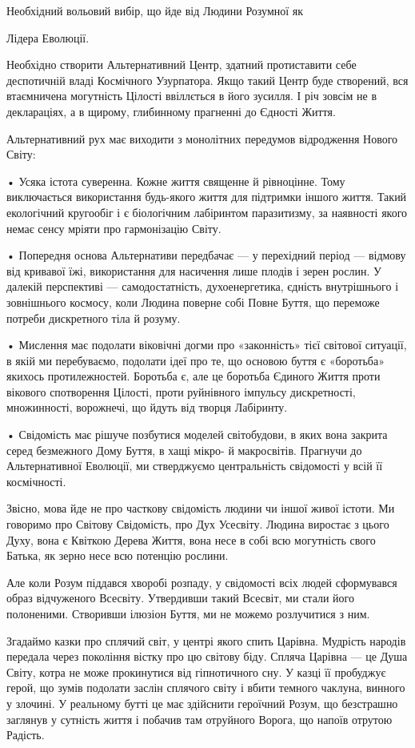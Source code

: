 Необхідний вольовий вибір, що йде від Людини Розумної як

Лідера Еволюції.

Необхідно створити Альтернативний Центр, здатний протиставити себе деспотичній
владі Космічного Узурпатора. Якщо такий Центр буде створений, вся втаємничена
могутність Цілості ввіллється в його зусилля. І річ зовсім не в деклараціях, а
в щирому, глибинному прагненні до Єдності Життя.

Альтернативний рух має виходити з монолітних передумов відродження Нового
Світу:

• Усяка істота суверенна. Кожне життя священне й рівноцінне. Тому виключається
використання будь-якого життя для підтримки іншого життя. Такий екологічний
кругообіг і є біологічним лабіринтом паразитизму, за наявності якого немає
сенсу мріяти про гармонізацію Світу.

• Попередня основа Альтернативи передбачає — у перехідний період — відмову від
кривавої їжі, використання для насичення лише плодів і зерен рослин. У далекій
перспективі — самодостатність, духоенергетика, єдність внутрішнього і
зовнішнього космосу, коли Людина поверне собі Повне Буття, що переможе потреби
дискретного тіла й розуму.

• Мислення має подолати віковічні догми про «законність» тієї світової
ситуації, в якій ми перебуваємо, подолати ідеї про те, що основою буття є
«боротьба» якихось протилежностей. Боротьба є, але це боротьба Єдиного Життя
проти вікового спотворення Цілості, проти руйнівного імпульсу дискретності,
множинності, ворожнечі, що йдуть від творця Лабіринту.

• Свідомість має рішуче позбутися моделей світобудови, в яких вона закрита
серед безмежного Дому Буття, в хащі мікро- й макросвітів. Прагнучи до
Альтернативної Еволюції, ми стверджуємо центральність свідомості у всій її
космічності.

Звісно, мова йде не про часткову свідомість людини чи іншої живої істоти. Ми
говоримо про Світову Свідомість, про Дух Усесвіту. Людина виростає з цього
Духу, вона є Квіткою Дерева Життя, вона несе в собі всю могутність свого
Батька, як зерно несе всю потенцію рослини.

Але коли Розум піддався хворобі розпаду, у свідомості всіх людей сформувався
образ відчуженого Всесвіту. Утвердивши такий Всесвіт, ми стали його полоненими.
Створивши ілюзіон Буття, ми не можемо розлучитися з ним.

Згадаймо казки про сплячий світ, у центрі якого спить Царівна. Мудрість народів
передала через покоління вістку про цю світову біду. Спляча Царівна — це Душа
Світу, котра не може прокинутися від гіпнотичного сну. У казці її пробуджує
герой, що зумів подолати заслін сплячого світу і вбити темного чаклуна, винного
у злочині. У реальному бутті це має здійснити героїчний Розум, що безстрашно
заглянув у сутність життя і побачив там отруйного Ворога, що напоїв отрутою
Радість.


